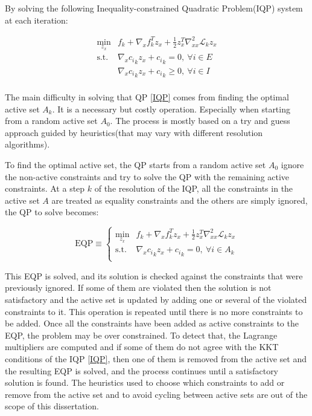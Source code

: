 By solving the following Inequality-constrained Quadratic Problem(IQP) system at each iteration:

\begin{equation}
  \label{IQP}
  \begin{array}{ll}
    \min\limits_{z_x} &f_k + \nabla_x f_k ^T z_x + \frac{1}{2} z_x^T\nabla_{xx}^2\mathcal{L}_k z_x \\
    \text{s.t.} & \nabla_x {c_i}_k z_x + {c_i}_k = 0 ,\ \forall i\in E\\
                & \nabla_x {c_i}_k z_x + {c_i}_k \geq 0 ,\ \forall i\in I\\
  \end{array}
\end{equation}

The main difficulty in solving that QP \ref{IQP} comes from finding the optimal active set $\mathit{A}_k$.
It is a necessary but costly operation.
Especially when starting from a random active set $\mathit{A}_0$.
The process is mostly based on a try and guess approach guided by heuristics(that may vary with different resolution algorithms).

To find the optimal active set, the QP starts from a random active set $\mathit{A}_0$ ignore the non-active constraints and try to solve the QP with the remaining active constraints.
At a step $k$ of the resolution of the IQP, all the constraints in the active set $\mathit{A}$ are treated as equality constraints and the others are simply ignored, the QP to solve becomes:

\begin{equation}
  \text{EQP} \equiv \left\{
  \begin{array}{ll}
    \min\limits_{z_x} &f_k + \nabla_x f_k ^T z_x + \frac{1}{2} z_x^T\nabla_{xx}^2\mathcal{L}_k z_x \\
    \text{s.t.} & \nabla_x {c_i}_k z_x + {c_i}_k = 0 ,\ \forall i\in \mathit{A}_k\\
  \end{array}
  \right.
\end{equation}

This EQP is solved, and its solution is checked against the constraints that were previously ignored.
If some of them are violated then the solution is not satisfactory and the active set is updated by adding one or several of the violated constraints to it.
This operation is repeated until there is no more constraints to be added.
Once all the constraints have been added as active constraints to the EQP, the problem may be over constrained.
To detect that, the Lagrange multipliers are computed and if some of them do not agree with the KKT conditions of the IQP \ref{IQP}, then one of them is removed from the active set and the resulting EQP is solved, and the process continues until a satisfactory solution is found.
The heuristics used to choose which constraints to add or remove from the active set and to avoid cycling between active sets are out of the scope of this dissertation.

